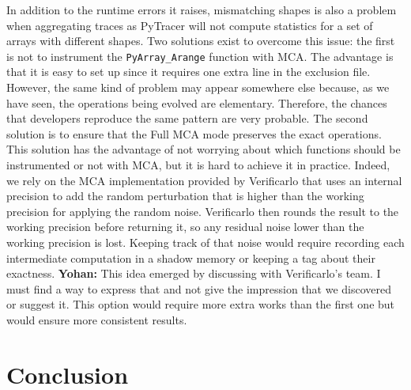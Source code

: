 \documentclass[11pt]{article}
\newcommand{\tristan}[1]{\color{orange}\textbf{From Tristan:} #1\color{black}\xspace}
\newcommand{\Yohan}[1]{\color{green!75!black}\textbf{Yohan:} #1\color{black}\xspace}
\newcommand{\pytracer}[0]{PyTracer\xspace}
\begin{document}
In addition to the runtime errors it raises, mismatching shapes is also a problem when aggregating traces as PyTracer will not compute statistics for a set of arrays with different shapes.
Two solutions exist to overcome this issue: the first is not to instrument the \texttt{PyArray\_Arange} function with MCA. The advantage is that it is easy to set up since it requires one extra line in the exclusion file.
However, the same kind of problem may appear somewhere else
because, as we have seen, the operations being evolved are elementary. Therefore, the chances that developers reproduce the same pattern are very probable. The second solution is to ensure that the Full MCA mode preserves the exact operations.
This solution has the advantage of not worrying about which functions should be instrumented or not with MCA, but it is hard to achieve it in practice. Indeed, we rely on the MCA implementation provided by Verificarlo that uses an internal precision to add the random perturbation that is higher than the working precision for applying the random noise. Verificarlo then rounds the result to the working precision before returning it, so any residual noise lower than the working precision is lost. 
Keeping track of that noise would require recording each intermediate computation in a shadow memory or keeping a tag about their exactness.
\Yohan{This idea emerged by discussing with Verificarlo's team. 
I must find a way to express that and not give the impression that we discovered or suggest it.}
This option would require more extra works than the first one but would ensure more consistent results.

\section{Conclusion}


\end{document}
